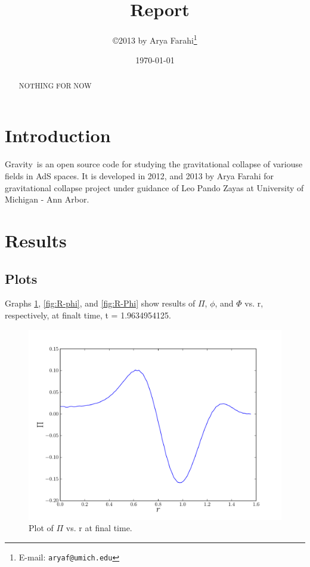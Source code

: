 \documentclass[12pt]{article}
\title{\grv\ Report}
\author{\copyright 2013 by Arya Farahi\thanks{E-mail: {\tt aryaf@umich.edu}}}
\date{\today}
\def\grv{{\sc Gravity}}
\begin{document}
\maketitle

\begin{abstract}
NOTHING FOR NOW
\end{abstract}


\section{Introduction}

\grv\ is an open source code for studying the gravitational collapse of variouse fields in AdS spaces. It is developed in 2012, and 2013 by Arya Farahi for gravitational collapse project under guidance of Leo Pando Zayas at University of Michigan - Ann Arbor. 
\section{Results}
\subsection{Plots}

Graphs \ref{fig:R-Pi}, \ref{fig:R-phi}, and \ref{fig:R-Phi} show results of $\Pi$, $\phi$, and $\Phi$ vs. r, respectively, at finalt time, t =  1.9634954125.

\begin{figure}[hbt]
 \centering
 \includegraphics[width=12cm]{PivrR.pdf}
 \caption{Plot of $\Pi$ vs. r at final time.}
 \label{fig:R-Pi}
\end{figure}
\end{document}
